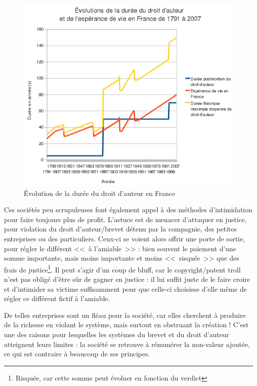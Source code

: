 \begin{figure}[H]
\center
\includegraphics[scale=.85]{images/duree_du_droit_d'auteur_en_France_depuis_1791.png}
\caption{Évolution de la durée du droit d'auteur en France}
\end{figure}

Ces sociétés peu scrupuleuses font également appel à des méthodes d'intimidation pour faire toujours plus de profit.
L'astuce est de menacer d'attaquer en justice, pour violation du droit d'auteur/brevet détenu par la compagnie, des petites entreprises ou des particuliers.
Ceux-ci se voient alors offrir une porte de sortie, pour régler le différent <<~à l'amiable~>> : bien souvent le paiement d'une somme importante, mais moins importante et moins <<~risquée~>> que des frais de justice\footnote{Risquée, car cette somme peut évoluer en fonction du verdict}.
Il peut s'agir d'un coup de bluff, car le copyright/patent troll n'est pas obligé d'être sûr de gagner en justice : il lui suffit juste de le faire croire et d'intimider sa victime suffisamment pour que celle-ci choisisse d'elle même de régler ce différent fictif à l'amiable.

De telles entreprises sont un fléau pour la société, car elles cherchent à produire de la richesse en violant le système, mais surtout en obstruant la création !
C'est une des raisons pour lesquelles les systèmes du brevet et du droit d'auteur atteignent leurs limites : la société se retrouve à rémunérer la non-valeur ajoutée, ce qui est contraire à beaucoup de ses principes.

